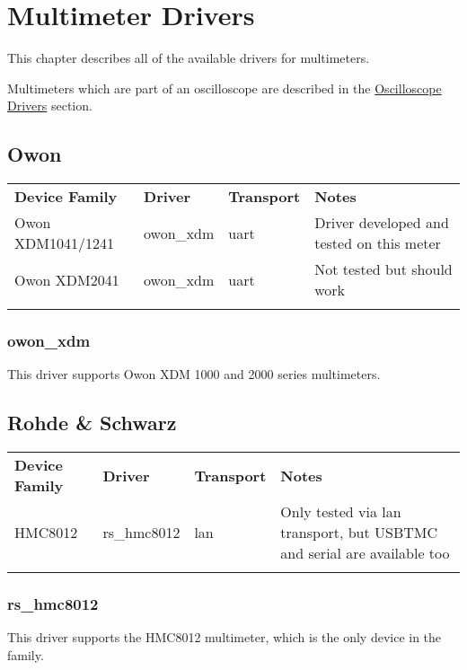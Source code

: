 \chapter{Multimeter Drivers}
\label{sec:meter-drivers}

This chapter describes all of the available drivers for multimeters.

Multimeters which are part of an oscilloscope are described in the \hyperref[sec:scope-drivers]{Oscilloscope
Drivers} section.

\section{Owon}

\begin{tabularx}{16cm}{lllX}
\thickhline
\textbf{Device Family} & \textbf{Driver} & \textbf{Transport} & \textbf{Notes} \\
\thickhline
Owon XDM1041/1241 & owon\_xdm & uart & Driver developed and tested on this meter\\
\thinhline
Owon XDM2041 & owon\_xdm & uart & Not tested but should work\\
\thickhline
\end{tabularx}

\subsection{owon\_xdm}

This driver supports Owon XDM 1000 and 2000 series multimeters.

\section{Rohde \& Schwarz}

\begin{tabularx}{16cm}{lllX}
\thickhline
\textbf{Device Family} & \textbf{Driver} & \textbf{Transport} & \textbf{Notes} \\
\thickhline
HMC8012 & rs\_hmc8012 & lan & Only tested via lan transport, but USBTMC and serial are available too\\
\thickhline
\end{tabularx}

\subsection{rs\_hmc8012}

This driver supports the HMC8012 multimeter, which is the only device in the family.
